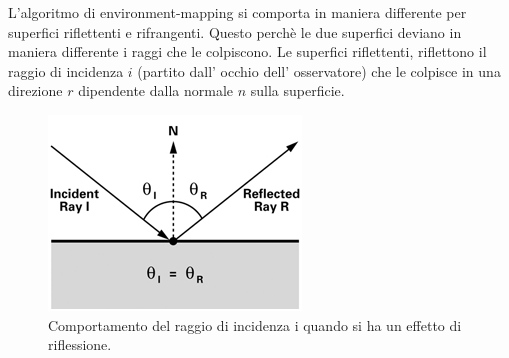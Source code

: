 L’algoritmo di environment-mapping si comporta in maniera differente per superfici riflettenti e rifrangenti. Questo perchè le due superfici deviano in maniera differente i raggi che le colpiscono.
Le superfici riflettenti, riflettono il raggio di incidenza $i$ (partito dall’ occhio dell’ osservatore) che le colpisce in una direzione $r$ dipendente dalla normale $n$ sulla superficie.
\\
\begin{figure}[htb]
 \centering
 \includegraphics[width=0.5\linewidth]{images/chapter_stato_arte/stato_arte_inc_refl.png}\hfill
 \caption[Env map: riflessione]{Comportamento del raggio di incidenza i quando si ha un effetto di riflessione.}
 \label{fig:stato_arte_inc_refl}
\end{figure}


